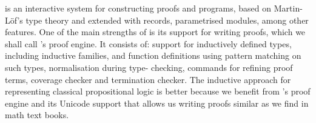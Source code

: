 \documentclass[../main.tex]{subfiles}
\begin{document}
\Agda is an interactive system for constructing proofs and programs,
based on Martin-L\"{o}f's type theory and extended with records, parametrised
modules, among other features.
One of the main strengths of \Agda is its support for writing proofs,
which we shall call \Agda's proof engine. It consists of: support for
inductively defined types, including inductive families, and function
definitions using pattern matching on such types, normalisation during type-
checking, commands for refining proof terms, coverage checker and termination
checker.
The inductive approach for representing classical propositional logic
is better because we benefit from \Agda's proof engine and its Unicode
support that allows us writing proofs similar as we find in math text books.








\end{document}
